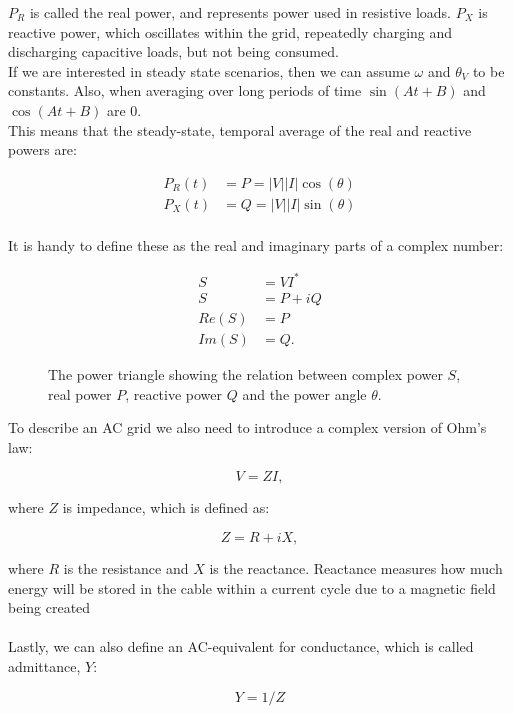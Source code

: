 $P_R$ is called the real power, and represents power used in resistive loads. $P_X$
is reactive power, which oscillates within the grid, repeatedly charging and discharging
capacitive loads, but not being consumed. \\
If we are interested in steady state scenarios, then we can assume $\omega$ and $\theta_V$ 
to be constants. Also, when averaging over long periods of time
$\sin(A t + B)$ and $\cos(A t + B)$ are 0.\\ This means that the steady-state,
temporal average of the real and reactive powers are:

\begin{equation}
    \begin{aligned}
        P_R(t) &= P = |V||I| \cos(\theta)\\
        P_X(t) &= Q = |V||I| \sin(\theta)\\
    \end{aligned}
    \label{eq:ac:power_react_and_imag}
\end{equation}

It is handy to define these as the real and imaginary parts of a complex number:

\begin{equation}
    \begin{aligned}
        S     &= V I^*\\
        S     &= P + iQ\\
        Re(S) &= P\\ 
        Im(S) &= Q.
    \end{aligned}
    \label{eq:ac:complex}
\end{equation}

\begin{figure}[H]
    \centering
    
    \caption{
        The power triangle showing the relation between complex power $S$,
        real power $P$, reactive power $Q$ and the power angle $\theta$.
    }
    \label{fig:ac:power_triangle}
\end{figure}

To describe an AC grid we also need to introduce a complex version
of Ohm's law:

\begin{equation}
    V = ZI,
    \label{eq:ac:ohm_complex}
\end{equation}

where $Z$ is impedance, which is defined as:

\begin{equation}
    Z = R + iX,
    \label{eq:ac:impedance}
\end{equation}

where $R$ is the resistance and $X$ is the reactance. Reactance measures how much
energy will be stored in the cable within a current cycle due to a magnetic
field being created\\
\\
Lastly, we can also define an AC-equivalent for conductance,
which is called admittance, $Y$:

\begin{equation}
    Y = 1/Z
    \label{eq:ac:admittance}
\end{equation}
